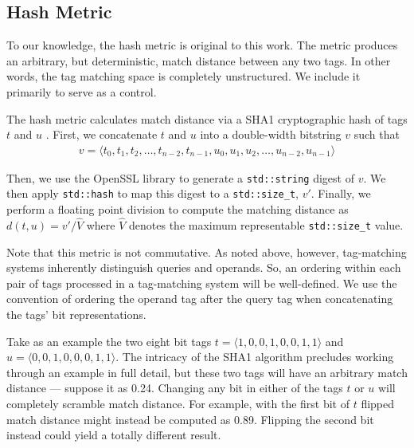 \subsection{Hash Metric} \label{sec:hash}

To our knowledge, the hash metric is original to this work.
The metric produces an arbitrary, but deterministic, match distance between any two tags.
In other words, the tag matching space is completely unstructured.
We include it primarily to serve as a control.

The hash metric calculates match distance via a SHA1 cryptographic hash of tags $t$ and $u$ \citep{eastlake2001us}.
First, we concatenate $t$ and $u$ into a double-width bitstring $v$ such that
\begin{align*}
v = \langle t_0, t_1, t_2, \dots, t_{n-2}, t_{n-1}, u_0, u_1, u_2, \dots, u_{n-2}, u_{n-1} \rangle
\end{align*}

Then, we use the OpenSSL library to generate a \texttt{std::string} digest of $v$.
We then apply \texttt{std::hash} to map this digest to a \texttt{std::size\_t}, $v'$.
Finally, we perform a floating point division to compute the matching distance as $d(t, u) = v' / \hat{V}$ where $\hat{V}$  denotes the maximum representable \texttt{std::size\_t} value.

Note that this metric is not commutative.
As noted above, however, tag-matching systems inherently distinguish queries and operands.
So, an ordering within each pair of tags processed in a tag-matching system will be well-defined.
We use the convention of ordering the operand tag after the query tag when concatenating the tags' bit representations.

Take as an example the two eight bit tags $t = \langle 1, 0, 0, 1, 0, 0, 1, 1 \rangle$ and $u = \langle 0, 0, 1, 0, 0, 0, 1, 1 \rangle$.
The intricacy of the SHA1 algorithm precludes working through an example in full detail, but these two tags will have an arbitrary match distance --- suppose it as 0.24.
Changing any bit in either of the tags $t$ or $u$ will completely scramble match distance.
For example, with the first bit of $t$ flipped match distance might instead be computed as 0.89.
Flipping the second bit instead could yield a totally different result.
